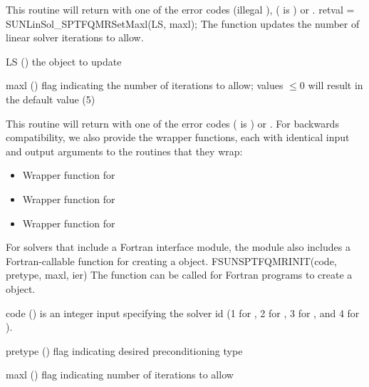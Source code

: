 {
  This routine will return with one of the error codes
   (illegal ), 
  ( is ) or .
}
{
}
{
  retval = SUNLinSol\_SPTFQMRSetMaxl(LS, maxl);
}
{
  The function  updates the number of
  linear solver iterations to allow.
}
{
  \begin{args}[maxl]
  \item[LS] ()
    the {\sunlinsolsptfqmr} object to update
  \item[maxl] ()
    flag indicating the number of iterations to allow; values $\le0$
    will result in the default value (5)
  \end{args}
}
{
  This routine will return with one of the error codes
   ( is ) or .
}
{
}
For backwards compatibility, we also provide the wrapper functions,
each with identical input and output arguments to the routines that
they wrap:
\begin{itemize}

\item {}

  Wrapper function for 

\item {}

  Wrapper function for 

\item {}

  Wrapper function for 

\end{itemize}
For solvers that include a Fortran interface module, the
{\sunlinsolsptfqmr} module also includes a Fortran-callable function
for creating a  object.
{
  FSUNSPTFQMRINIT(code, pretype, maxl, ier)
}
{
  The function  can be called for Fortran programs
  to create a {\sunlinsolsptfqmr} object.
}
{
  \begin{args}[pretype]
  \item[code] ()
    is an integer input specifying the solver id (1 for {\cvode}, 2
    for {\ida}, 3 for {\kinsol}, and 4 for {\arkode}).
  \item[pretype] ()
    flag indicating desired preconditioning type
  \item[maxl] ()
    flag indicating number of iterations to allow
  \end{args}
}
